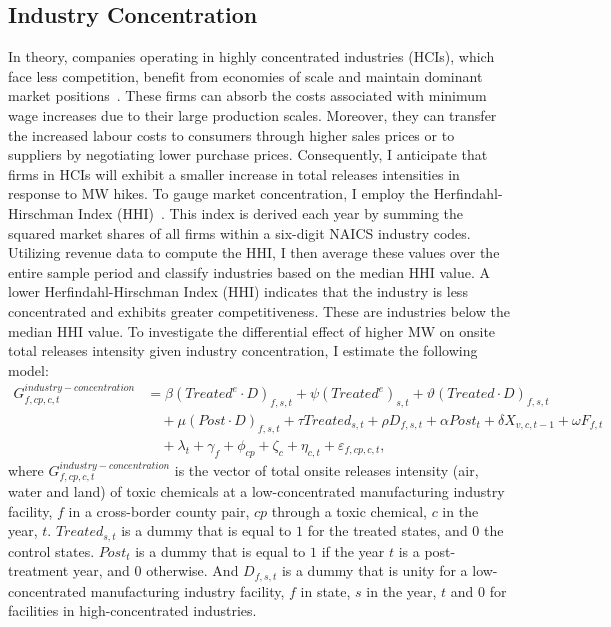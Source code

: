 \documentclass[12pt, english]{article}
\begin{document}
    \subsection{Industry Concentration}\label{subsec:industry-concentration}
    In theory, companies operating in highly concentrated industries (HCIs), which face less competition, benefit from economies of scale and maintain dominant market positions~\parencite{baumol1982contestable}. These firms can absorb the costs associated with minimum wage increases due to their large production scales. Moreover, they can transfer the increased labour costs to consumers through higher sales prices or to suppliers by negotiating lower purchase prices. Consequently, I anticipate that firms in HCIs will exhibit a smaller increase in total releases intensities in response to MW hikes. To gauge market concentration, I employ the Herfindahl-Hirschman Index (HHI)~\parencite{zhang2023unintended, weinstock1982using}. This index is derived each year by summing the squared market shares of all firms within a six-digit NAICS industry codes. Utilizing revenue data to compute the HHI, I then average these values over the entire sample period and classify industries based on the median HHI value. A lower Herfindahl-Hirschman Index (HHI) indicates that the industry is less concentrated and exhibits greater competitiveness. These are industries below the median HHI value. To investigate the differential effect of higher MW on onsite total releases intensity given industry concentration, I estimate the following model:
    \begin{align}
        G_{f,cp,c,t}^{industry-concentration} &= \beta (Treated^{e} \cdot D)_{f,s,t} + \psi (Treated^{e})_{s,t} + \vartheta (Treated \cdot D)_{f,s,t} \nonumber \\
        &\quad + \mu (Post \cdot D)_{f,s,t} + \tau Treated_{s,t} + \rho D_{f,s,t} + \alpha Post_{t} + \delta X_{v,c,t-1} + \omega F_{f,t} \nonumber \\
        &\quad + \lambda_{t} + \gamma_{f} + \phi_{cp} + \zeta_{c} + \eta_{c,t} + \varepsilon_{f,cp,c,t},\label{eq:heterogeneous-onsite-releases-intensity-lcis}
    \end{align}
    where $G_{f,cp,c,t}^{industry-concentration}$ is the vector of total onsite releases intensity (air, water and land) of toxic chemicals at a low-concentrated manufacturing industry facility, $f$ in a cross-border county pair, $cp$ through a toxic chemical, $c$ in the year, $t$. $Treated_{s,t}$ is a dummy that is equal to $1$ for the treated states, and $0$ the control states. $Post_{t}$ is a dummy that is equal to $1$ if the year $t$ is a post-treatment year, and $0$ otherwise. And $D_{f,s,t}$ is a dummy that is unity for a low-concentrated manufacturing industry facility, $f$ in state, $s$ in the year, $t$ and $0$ for facilities in high-concentrated industries.
    
\end{document}
